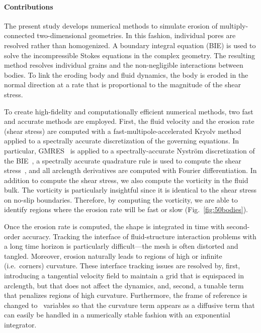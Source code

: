 \documentclass[preprint, 10pt]{elsarticle}
\begin{document}
\paragraph{Contributions} The present study develops numerical methods
to simulate erosion of multiply-connected two-dimensional geometries.
In this fashion, individual pores are resolved rather than
homogenized.  A boundary integral equation (BIE) is used to solve the
incompressible Stokes equations in the complex geometry.  The resulting
method resolves individual grains and the non-negligible interactions
between bodies.  To link the eroding body and fluid dynamics, the body
is eroded in the normal direction at a rate that is proportional to the
magnitude of the shear stress.

To create high-fidelity and computationally efficient numerical methods,
two fast and accurate methods are employed.  First, the fluid velocity
and the erosion rate (shear stress) are computed with a
fast-multipole-accelerated Kryolv method applied to a spectrally
accurate discretization of the governing equations.  In particular,
GMRES~\cite{saa-sch1986} is applied to a spectrally-accurate Nystr\"om
discretization of the BIE~\cite{tre-wei2014}, a spectrally accurate
quadrature rule is used to compute the shear stress~\cite{sid-isr1988},
and all arclength derivatives are computed with Fourier differentiation.
In addition to compute the shear stress, we also compute the vorticity
in the fluid bulk.  The vorticity is particularly insightful since it is
identical to the shear stress on no-slip boundaries.  Therefore, by
computing the vorticity, we are able to identify regions where the
erosion rate will be fast or slow (Fig.~\ref{fig:50bodies}).

Once the erosion rate is computed, the shape is integrated in time with
second-order accuracy.  Tracking the interface of fluid-structure
interaction problems with a long time horizon is particularly
difficult---the mesh is often distorted and tangled.  Moreover, erosion
naturally leads to regions of high or infinite (i.e.~corners) curvature.
These interface tracking issues are resolved by, first, introducing a
tangential velocity field to maintain a grid that is equispaced in
arclength, but that does not affect the dynamics, and, second, a tunable
term that penalizes regions of high curvature.  Furthermore, the frame
of reference is changed to \thL~variables so that the curvature term
appears as a diffusive term that can easily be handled in a numerically
stable fashion with an exponential integrator.
\end{document}
